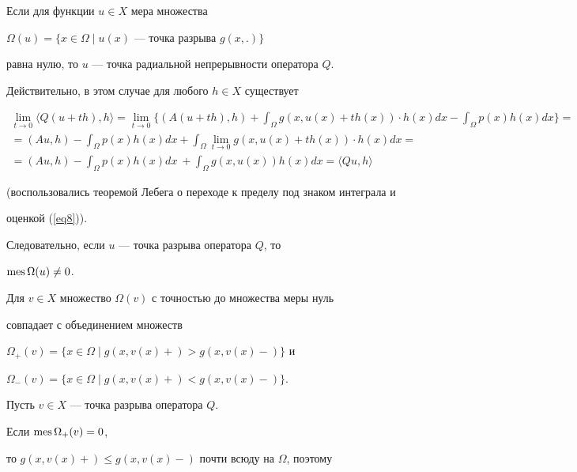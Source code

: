 Если для функции $u \in X$ мера множества


$\Omega(u)=\{x \in \Omega \mid u(x)$ --- точка разрыва $g(x,.)\}$


равна нулю, то $u$ --- точка радиальной непрерывности оператора $Q$.


Действительно, в этом случае для любого $h \in X$ существует


\begin{multline*}


\lim\limits_{t \to 0} \langle Q(u+th),h \rangle =


\lim\limits_{t \to 0} \{(A(u+th),h)+


\int_\Omega g(x,u(x)+th(x)) \cdot h(x) dx -


\int_\Omega p(x)h(x) dx\}= \\


%


= (Au,h)- \int_\Omega p(x)h(x) dx


+\int_\Omega \lim\limits_{t\to 0} g(x,u(x)+th(x)) \cdot h(x) dx= \\


%


=(Au,h)- \int_\Omega p(x)h(x) dx\ + \int_\Omega


g(x,u(x)) h(x) dx= \langle Qu,h \rangle 


\end{multline*}


(воспользовались теоремой Лебега о переходе к пределу под знаком интеграла и


оценкой (\ref{eq8})).


Следовательно, если $u$ --- точка разрыва оператора $Q$, то


$\operatorname{mes}\Omega(u) \ne 0$.





Для $v \in X$ множество $\Omega(v)$ с точностью до множества меры нуль


совпадает с объединением множеств


$\Omega_{+}(v)=\{x \in \Omega \mid g(x,v(x)+)>g(x,v(x)-)\}$ и


$\Omega_{-}(v)=\{x \in \Omega \mid g(x,v(x)+)<g(x,v(x)-)\}$.





Пусть $v\in X$ --- точка разрыва оператора $Q$.


Если $\operatorname{mes}\Omega_{+}(v) = 0$,


то $g(x,v(x)+) \le g(x,v(x)-)$ почти всюду на $\Omega$, поэтому


